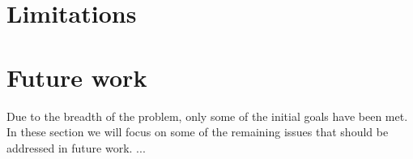 



\section{Limitations}
\label{sec:limitations}




\section{Future work}
\label{sec:futureWork}










Due to the breadth of the problem, only some of the initial goals have been
met. In these section we will focus on some of the remaining issues that
should be addressed in future work. ...


